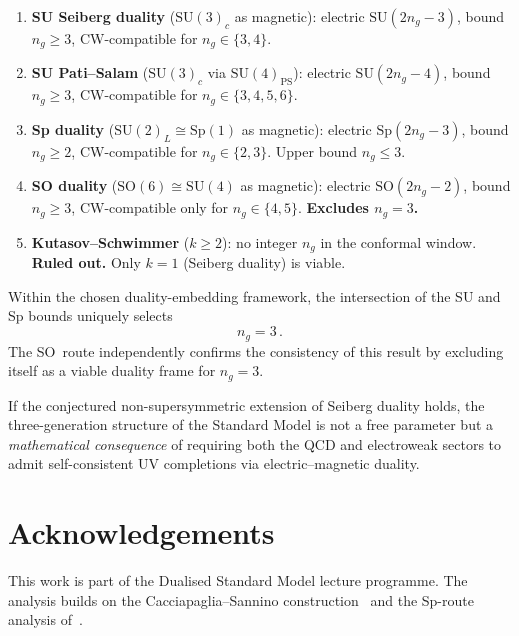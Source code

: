\documentclass[11pt,a4paper]{article}
\theoremstyle{plain}
\theoremstyle{definition}
\theoremstyle{remark}
\newcommand{\ngen}{n_g}
\newcommand{\SU}[1]{\mathrm{SU}(#1)}
\newcommand{\SO}[1]{\mathrm{SO}(#1)}
\newcommand{\Sp}[1]{\mathrm{Sp}(#1)}
\begin{document}
\begin{enumerate}
  \item \textbf{SU Seiberg duality} ($\SU{3}_c$ as magnetic):
    electric $\SU{2\ngen - 3}$, bound $\ngen \geq 3$, CW-compatible for
    $\ngen \in \{3, 4\}$.

  \item \textbf{SU Pati--Salam} ($\SU{3}_c$ via $\SU{4}_{\mathrm{PS}}$):
    electric $\SU{2\ngen - 4}$, bound $\ngen \geq 3$, CW-compatible for
    $\ngen \in \{3, 4, 5, 6\}$.

  \item \textbf{Sp duality} ($\SU{2}_L \cong \Sp{1}$ as magnetic):
    electric $\Sp{2\ngen - 3}$, bound $\ngen \geq 2$, CW-compatible for
    $\ngen \in \{2, 3\}$.  Upper bound $\ngen \leq 3$.

  \item \textbf{SO duality} ($\SO{6} \cong \SU{4}$ as magnetic):
    electric $\SO{2\ngen - 2}$, bound $\ngen \geq 3$, CW-compatible only
    for $\ngen \in \{4, 5\}$.  \textbf{Excludes $\ngen = 3$.}

  \item \textbf{Kutasov--Schwimmer} ($k \geq 2$): no integer $\ngen$ in
    the conformal window.  \textbf{Ruled out.}  Only $k = 1$ (Seiberg
    duality) is viable.
\end{enumerate}

Within the chosen duality-embedding framework, the intersection of the SU and Sp bounds uniquely selects
\begin{equation}
  \boxed{\ngen = 3}\,.
\end{equation}
The SO~route independently confirms the consistency of this result by
excluding itself as a viable duality frame for $\ngen = 3$.

If the conjectured non-supersymmetric extension of Seiberg duality holds,
the three-generation structure of the Standard Model is not a free
parameter but a \emph{mathematical consequence} of requiring both the QCD
and electroweak sectors to admit self-consistent UV completions via
electric--magnetic duality.


\section*{Acknowledgements}

This work is part of the Dualised Standard Model lecture programme.
The analysis builds on the Cacciapaglia--Sannino
construction~\cite{CacciapagliaSannino2024} and the Sp-route analysis
of~\cite{Paper1}.
\end{document}
